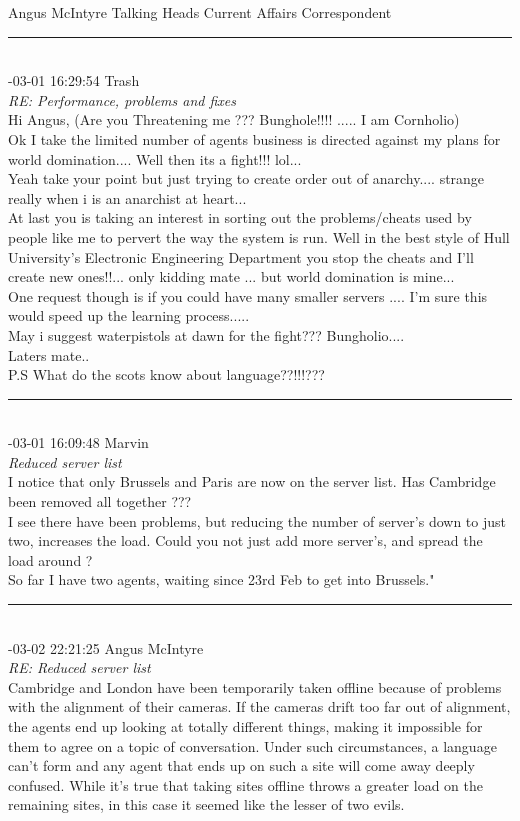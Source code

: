 \begin{mail}
  Angus McIntyre
  Talking Heads Current Affairs Correspondent \\
\rule{0.8\textwidth}{.4pt}\\
{-03-01 16:29:54 Trash}\\
{\itshape RE: Performance, problems and fixes}\\
Hi Angus, (Are you Threatening me ??? Bunghole!!!! ..... I am Cornholio)\\
Ok I take the limited number of agents business is directed against my plans for world domination.... Well then its a fight!!! lol...\\
Yeah take your point but just trying to create order out of anarchy.... strange really when i is an anarchist at heart...\\
At last you is taking an interest in sorting out the problems/cheats used by people like me to pervert the way the system is run. Well in the best style of Hull University's Electronic Engineering Department you stop the cheats and I'll create new ones!!... only kidding mate ... but world domination is mine...\\
One request though is if you could have many smaller servers .... I'm sure this would speed up the learning process..... \\
May i suggest waterpistols at dawn for the fight??? Bungholio....\\
Laters mate..\\
P.S What do the scots know about language??!!!???\\
\rule{0.8\textwidth}{.4pt}\\
{-03-01 16:09:48 Marvin}\\
{\itshape Reduced server list}\\	
I notice that only Brussels and Paris are now on the server list. Has Cambridge been removed all together ???\\
I see there have been problems, but reducing the number of server's down to just two, increases the load. Could you not just add more server's, and spread the load around ?\\
So far I have two agents, waiting since 23rd Feb to get into Brussels."\\
\rule{0.8\textwidth}{.4pt}\\
{-03-02 22:21:25 Angus McIntyre}\\
{\itshape RE: Reduced server list}\\
Cambridge and London have been temporarily taken offline because of problems with the alignment of their cameras. If the cameras drift too far out of alignment, the agents end up looking at totally different things, making it impossible for them to agree on a topic of conversation. Under such circumstances, a language can't form and any agent that ends up on such a site will come away deeply confused. While it's true that taking sites offline throws a greater load on the remaining sites, in this case it seemed like the lesser of two evils.\\

\end{mail}
